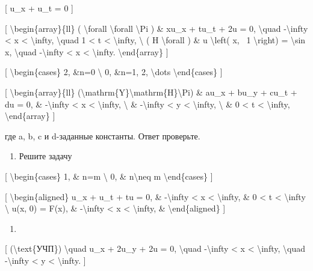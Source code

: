 \documentclass[
]{article}
\providecommand{\tightlist}{%
  \setlength{\itemsep}{0pt}\setlength{\parskip}{0pt}}
\begin{document}
{[} u\_x + u\_t = 0 {]}

{[} \textbackslash begin\{array\}\{ll\} ( \textbackslash forall
\textbackslash forall \textbackslash Pi ) \& xu\_x + tu\_t + 2u = 0,
\textbackslash quad -\textbackslash infty \textless{} x \textless{}
\textbackslash infty, \textbackslash quad 1 \textless{} t \textless{}
\textbackslash infty, \textbackslash{} ( H \textbackslash forall ) \& u
\textbackslash left( x, ~1 \textbackslash right) = \textbackslash sin x,
\textbackslash quad -\textbackslash infty \textless{} x \textless{}
\textbackslash infty. \textbackslash end\{array\} {]}

{[} \textbackslash begin\{cases\} 2, \&n=0 \textbackslash{} 0, \&n=1, 2,
\textbackslash dots \textbackslash end\{cases\} {]}

{[} \textbackslash begin\{array\}\{ll\}
(\textbackslash mathrm\{Y\}\textbackslash mathrm\{H\}\textbackslash Pi)
\& au\_x + bu\_y + cu\_t + du = 0, \& -\textbackslash infty \textless{}
x \textless{} \textbackslash infty, \textbackslash{} \&
-\textbackslash infty \textless{} y \textless{} \textbackslash infty,
\textbackslash{} \& 0 \textless{} t \textless{} \textbackslash infty,
\textbackslash end\{array\} {]}

где a, b, c и d-заданные константы. Ответ проверьте.

\begin{enumerate}
\def\labelenumi{\arabic{enumi}.}
\setcounter{enumi}{3}
\tightlist
\item
  Решите задачу
\end{enumerate}

{[} \textbackslash begin\{cases\} 1, \& n=m \textbackslash{} 0, \&
n\textbackslash neq m \textbackslash end\{cases\} {]}

{[} \textbackslash begin\{aligned\} u\_x + u\_t + tu = 0, \&
-\textbackslash infty \textless{} x \textless{} \textbackslash infty, \&
0 \textless{} t \textless{} \textbackslash infty \textbackslash{} u(x,
0) = F(x), \& -\textbackslash infty \textless{} x \textless{}
\textbackslash infty, \& \textbackslash end\{aligned\} {]}

\begin{enumerate}
\def\labelenumi{\arabic{enumi}.}
\setcounter{enumi}{5}
\tightlist
\item
\end{enumerate}

{[} (\textbackslash text\{УЧП\}) \textbackslash quad u\_x + 2u\_y + 2u =
0, \textbackslash quad -\textbackslash infty \textless{} x \textless{}
\textbackslash infty, \textbackslash quad -\textbackslash infty
\textless{} y \textless{} \textbackslash infty. {]}
\end{document}
